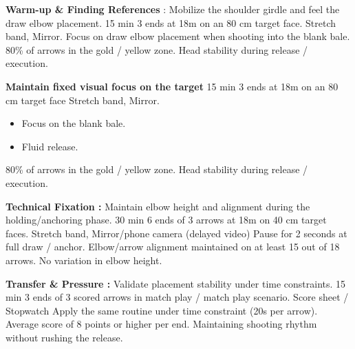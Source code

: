 \documentclass{../tex/ficheseance}
\begin{document}
	\makeficheheader

	\begin{tableauSeance}

		\ligneSeance
		{\textbf{Warm-up \& Finding References} : Mobilize the shoulder girdle and feel the draw elbow placement.} %
		{15 min} %
		{3 ends at 18m on an 80 cm target face.} %
		{Stretch band, Mirror.}         %
		{Focus on draw elbow placement when shooting into the blank bale.}              %
		{80\% of arrows in the gold / yellow zone.} %
		{Head stability during release / execution.}  %

		\ligneSeance
		{\textbf{Maintain fixed visual focus on the target}}
		{15 min}
		{3 ends at 18m on an 80 cm target face}
		{Stretch band, Mirror.}
		{\begin{itemize}[nosep,leftmargin=*]
				\item Focus on the blank bale.
				\item Fluid release.
		\end{itemize}}              %
		{80\% of arrows in the gold / yellow zone.}
		{Head stability during release / execution.}

		\ligneSeance
		{\textbf{Technical Fixation :} Maintain elbow height and alignment during the holding/anchoring phase.}
		{30 min}
		{6 ends of 3 arrows at 18m on 40 cm target faces.}
		{Stretch band, Mirror/phone camera (delayed video)}
		{Pause for 2 seconds at full draw / anchor.}
		{Elbow/arrow alignment maintained on at least 15 out of 18 arrows.}
		{No variation in elbow height.}

		\ligneSeance
		{\textbf{Transfer \& Pressure :} Validate placement stability under time constraints.}
		{15 min}
		{3 ends of 3 scored arrows in match play / match play scenario.}
		{Score sheet / Stopwatch}
		{Apply the same routine under time constraint (20s per arrow).}
		{Average score of 8 points or higher per end.}
		{Maintaining shooting rhythm without rushing the release.}

	\end{tableauSeance}
\end{document}
